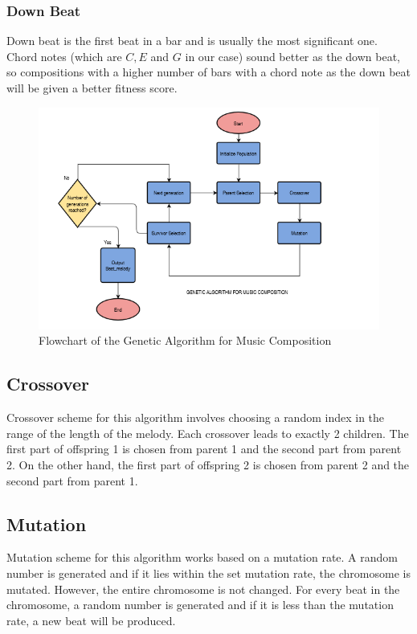 \documentclass[conference]{IEEEtran}
\begin{document}
\subsubsection{Down Beat}
Down beat is the first beat in a bar and is usually the most significant one. Chord notes (which are $C, E$ and $G$ in our case) sound better as the down beat, so compositions with a higher number of bars with a chord note as the down beat will be given a better fitness score.

\begin{figure}
\includegraphics[width=10 cm, height= 10 cm ]{Flowchart.png}
\caption{ Flowchart of the Genetic Algorithm for Music Composition}
\end{figure}

\subsection{Crossover}
Crossover scheme for this algorithm involves choosing a random index in the range of the length of the melody. Each crossover leads to exactly 2 children. The first part of offspring 1 is chosen from parent 1 and the second part from parent 2. On the other hand, the first part of offspring 2 is chosen from parent 2 and the second part from parent 1.

\subsection{Mutation}
Mutation scheme for this algorithm works based on a mutation rate. A random number is generated and if it lies within the set mutation rate, the chromosome is mutated. However, the entire chromosome is not changed. For every beat in the chromosome, a random number is generated and if it is less than the mutation rate, a new beat will be produced.
\end{document}
